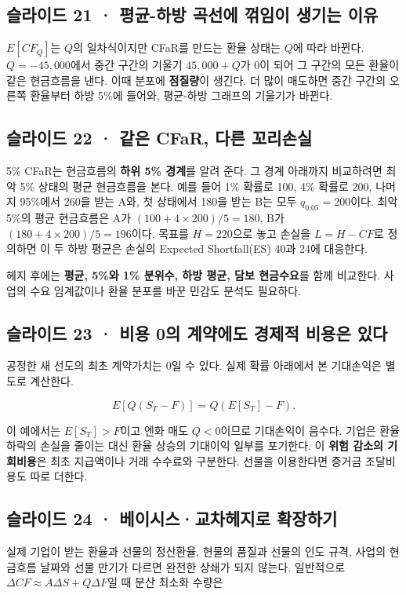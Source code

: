 \documentclass[11pt,a4paper]{article}
\begin{document}
\subsection{슬라이드 21 · 평균-하방 곡선에 꺾임이 생기는 이유}
$E[CF_Q]$는 $Q$의 일차식이지만 CFaR를 만드는 환율 상태는 $Q$에 따라 바뀐다. $Q=-45{,}000$에서 중간 구간의 기울기 $45{,}000+Q$가 0이 되어 그 구간의 모든 환율이 같은 현금흐름을 낸다. 이때 분포에 \textbf{점질량}이 생긴다. 더 많이 매도하면 중간 구간의 오른쪽 환율부터 하방 5\%에 들어와, 평균-하방 그래프의 기울기가 바뀐다.\par

\subsection{슬라이드 22 · 같은 CFaR, 다른 꼬리손실}
5\% CFaR는 현금흐름의 \textbf{하위 5\% 경계}를 알려 준다. 그 경계 아래까지 비교하려면 최악 5\% 상태의 평균 현금흐름을 본다. 예를 들어 1\% 확률로 100, 4\% 확률로 200, 나머지 95\%에서 260을 받는 A와, 첫 상태에서 180을 받는 B는 모두 $q_{0.05}=200$이다. 최악 5\%의 평균 현금흐름은 A가 $(100+4\times200)/5=180$, B가 $(180+4\times200)/5=196$이다. 목표를 $H=220$으로 놓고 손실을 $L=H-CF$로 정의하면 이 두 하방 평균은 손실의 Expected Shortfall(ES) 40과 24에 대응한다.\par

헤지 후에는 \textbf{평균, 5\%와 1\% 분위수, 하방 평균, 담보 현금수요}를 함께 비교한다. 사업의 수요 임계값이나 환율 분포를 바꾼 민감도 분석도 필요하다.\par

\subsection{슬라이드 23 · 비용 0의 계약에도 경제적 비용은 있다}
공정한 새 선도의 최초 계약가치는 0일 수 있다. 실제 확률 아래에서 본 기대손익은 별도로 계산한다.\par

\[
E[Q(S_T-F)]=Q(E[S_T]-F).
\]

이 예에서는 $E[S_T]>F$이고 엔화 매도 $Q<0$이므로 기대손익이 음수다. 기업은 환율 하락의 손실을 줄이는 대신 환율 상승의 기대이익 일부를 포기한다. 이 \textbf{위험 감소의 기회비용}은 최초 지급액이나 거래 수수료와 구분한다. 선물을 이용한다면 증거금 조달비용도 따로 더한다.\par

\subsection{슬라이드 24 · 베이시스·교차헤지로 확장하기}
실제 기업이 받는 환율과 선물의 정산환율, 현물의 품질과 선물의 인도 규격, 사업의 현금흐름 날짜와 선물 만기가 다르면 완전한 상쇄가 되지 않는다. 일반적으로 $\Delta CF\approx A\Delta S+Q\Delta F$일 때 분산 최소화 수량은\par
\end{document}
